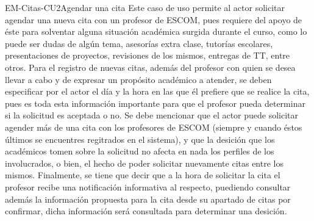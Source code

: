 \begin{UseCase}{EM-Citas-CU2}{Agendar una cita}{
	\noindent
	Este caso de uso permite al actor solicitar agendar una nueva cita con un profesor de ESCOM, pues requiere del apoyo de éste para solventar alguna situación académica surgida durante el curso, como lo puede ser dudas de algún tema, asesorías extra clase, tutorías escolares, presentaciones de proyectos, revisiones de los mismos, entregas de TT, entre otros.
	\newline
	Para el registro de nuevas citas, además del profesor con quien se desea llevar a cabo y de expresar un propósito académico a atender, se deben especificar por el actor el día y la hora en las que él prefiere que se realice la cita, pues es toda esta información importante para que el profesor pueda determinar si la solicitud es aceptada o no.
	\newline
	Se debe mencionar que el actor puede solicitar agender más de una cita con los profesores de ESCOM (siempre y cuando éstos últimos se encuentres regitrados en el sistema), y que la desición que los académicos tomen sobre la solicitud no afecta en nada los perfiles de los involucrados, o bien, el hecho de poder solicitar nuevamente citas entre los mismos. Finalmente, se tiene que decir que a la hora de solicitar la cita el profesor recibe una notificación informativa al respecto, puediendo consultar además la información propuesta para la cita desde su apartado de citas por confirmar, dicha información será consultada para determinar una desición. 
	}
\end{UseCase}
